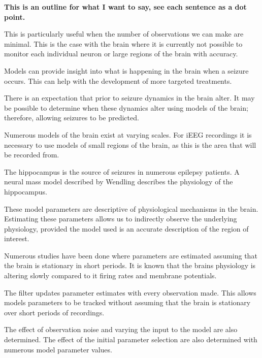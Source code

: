 \textbf{This is an outline for what I want to say, see each sentence as a dot point.}

	This is particularly useful when the number of observations we can make are minimal.
	This is the case with the brain where it is currently not possible to monitor each individual neuron or large regions of the brain with accuracy.

	Models can provide insight into what is happening in the brain when a seizure occurs.
	This can help with the development of more targeted treatments.
	
	There is an expectation that prior to seizure dynamics in the brain alter.
	It may be possible to determine when these dynamics alter using models of the brain; therefore, allowing seizures to be predicted.

	Numerous models of the brain exist at varying scales.
	For iEEG recordings it is necessary to use models of small regions of the brain, as this is the area that will be recorded from.
	
	The hippocampus is the source of seizures in numerous epilepsy patients.
	A neural mass model described by Wendling describes the physiology of the hippocampus.

	These model parameters are descriptive of physiological mechanisms in the brain.
	Estimating these parameters allows us to indirectly observe the underlying physiology, provided the model used is an accurate description of the region of 			interest.

	Numerous studies have been done where parameters are estimated assuming that the brain is stationary in short periods.
	It is known that the brains physiology is altering slowly compared to it firing rates and membrane potentials.

	The filter updates parameter estimates with every observation made.
	This allows models parameters to be tracked without assuming that the brain is stationary over short periods of recordings.

	The effect of observation noise and varying the input to the model are also determined.
	The effect of the initial parameter selection are also determined with numerous model parameter values. 

 

